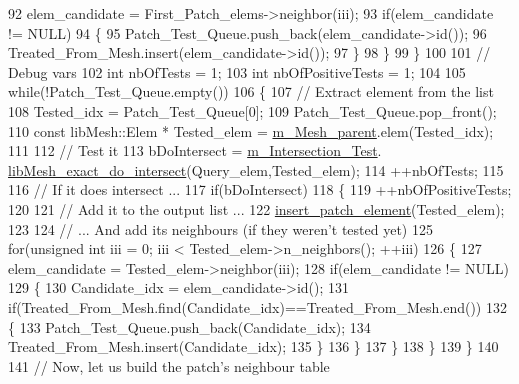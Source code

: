 \begin{DoxyCode}
92             elem\_candidate = First\_Patch\_elems->neighbor(iii);
93             \textcolor{keywordflow}{if}(elem\_candidate != NULL)
94             \{
95                 Patch\_Test\_Queue.push\_back(elem\_candidate->id());
96                 Treated\_From\_Mesh.insert(elem\_candidate->id());
97             \}
98         \}
99     \}
100 
101     \textcolor{comment}{// Debug vars}
102     \textcolor{keywordtype}{int} nbOfTests = 1;
103     \textcolor{keywordtype}{int} nbOfPositiveTests = 1;
104 
105     \textcolor{keywordflow}{while}(!Patch\_Test\_Queue.empty())
106     \{
107         \textcolor{comment}{// Extract element from the list}
108         Tested\_idx = Patch\_Test\_Queue[0];
109         Patch\_Test\_Queue.pop\_front();
110         \textcolor{keyword}{const} libMesh::Elem     * Tested\_elem = \hyperlink{classcarl_1_1_patch__construction_aec2f60b62d5d7b44bfcc4f9ca9de28d2}{m\_Mesh\_parent}.elem(Tested\_idx);
111 
112         \textcolor{comment}{// Test it}
113         bDoIntersect = \hyperlink{classcarl_1_1_patch__construction_a59f947d3d18761b1ad1a5913eb59ca83}{m\_Intersection\_Test}.
      \hyperlink{classcarl_1_1_intersection___tools_ae7b16748a45a0579bafecb48ef2fc4ce}{libMesh\_exact\_do\_intersect}(Query\_elem,Tested\_elem);
114         ++nbOfTests;
115 
116         \textcolor{comment}{// If it does intersect ...}
117         \textcolor{keywordflow}{if}(bDoIntersect)
118         \{
119             ++nbOfPositiveTests;
120 
121             \textcolor{comment}{// Add it to the output list ...}
122             \hyperlink{classcarl_1_1_patch__construction_ae7a46ef950445a82cb0036b49b778fbf}{insert\_patch\_element}(Tested\_elem);
123 
124             \textcolor{comment}{// ... And add its neighbours (if they weren't tested yet)}
125             \textcolor{keywordflow}{for}(\textcolor{keywordtype}{unsigned} \textcolor{keywordtype}{int} iii = 0; iii < Tested\_elem->n\_neighbors(); ++iii)
126             \{
127                 elem\_candidate = Tested\_elem->neighbor(iii);
128                 \textcolor{keywordflow}{if}(elem\_candidate != NULL)
129                 \{
130                     Candidate\_idx = elem\_candidate->id();
131                     \textcolor{keywordflow}{if}(Treated\_From\_Mesh.find(Candidate\_idx)==Treated\_From\_Mesh.end())
132                     \{
133                         Patch\_Test\_Queue.push\_back(Candidate\_idx);
134                         Treated\_From\_Mesh.insert(Candidate\_idx);
135                     \}
136                 \}
137             \}
138         \}
139     \}
140 
141     \textcolor{comment}{// Now, let us build the patch's neighbour table}

\end{DoxyCode}

